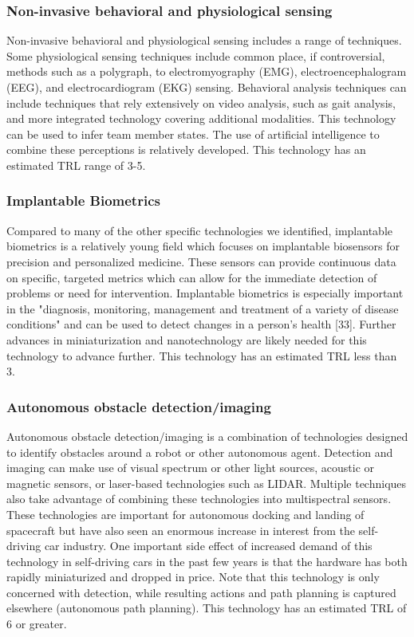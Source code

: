 \subsubsection{Non-invasive behavioral and physiological sensing}
Non-invasive behavioral and physiological sensing includes a range of techniques. Some physiological sensing techniques include common place, if controversial, methods such as a polygraph, to electromyography (EMG), electroencephalogram (EEG), and electrocardiogram (EKG) sensing. Behavioral analysis techniques can include techniques that rely extensively on video analysis, such as gait analysis, and more integrated technology covering additional modalities. This technology can be used to infer team member states. The use of artificial intelligence to combine these perceptions is relatively developed. This technology has an estimated TRL range of 3-5.

\subsubsection{Implantable Biometrics}
Compared to many of the other specific technologies we identified, implantable biometrics is a relatively young field which focuses on implantable biosensors for precision and personalized medicine. These sensors can provide continuous data on specific, targeted metrics which can allow for the immediate detection of problems or need for intervention. Implantable biometrics is especially important in the "diagnosis, monitoring, management and treatment of a variety of disease conditions" and can be used to detect changes in a person’s health [33]. Further advances in miniaturization and nanotechnology are likely needed for this technology to advance further. This technology has an estimated TRL less than 3.

\subsubsection{Autonomous obstacle detection/imaging}
Autonomous obstacle detection/imaging is a combination of technologies designed to identify obstacles around a robot or other autonomous agent. Detection and imaging can make use of visual spectrum or other light sources, acoustic or magnetic sensors, or laser-based technologies such as LIDAR. Multiple techniques also take advantage of combining these technologies into multispectral sensors. These technologies are important for autonomous docking and landing of spacecraft but have also seen an enormous increase in interest from the self-driving car industry. One important side effect of increased demand of this technology in self-driving cars in the past few years is that the hardware has both rapidly miniaturized and dropped in price. Note that this technology is only concerned with detection, while resulting actions and path planning is captured elsewhere (autonomous path planning). This technology has an estimated TRL of 6 or greater.

